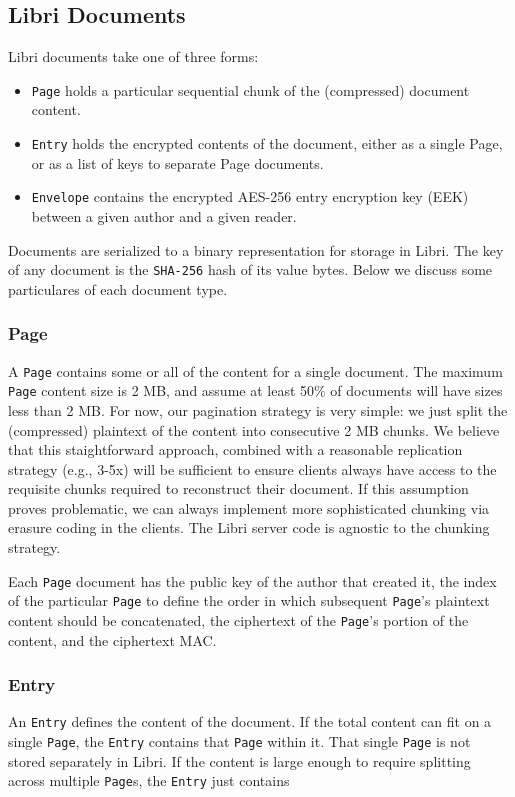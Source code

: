 \documentclass[10pt]{article}
\def\Entry{\texttt{Entry}}
\def\Page{\texttt{Page}}
\def\Envelope{\texttt{Envelope}}
\begin{document}
\subsection{Libri Documents}
\label{sec:Docs}
Libri documents take one of three forms:
\begin{itemize}
	\item \Page{} holds a particular sequential chunk of the (compressed) document content. 
	\item \Entry{} holds the encrypted contents of the document, either as a single Page, or as a list of keys to separate Page documents.
	\item \Envelope{} contains the encrypted AES-256 entry encryption key (EEK) between a given author and a given reader.
\end{itemize}
Documents are serialized to a binary representation for storage in Libri. The key of any document is the \texttt{SHA-256} hash of its value bytes. Below we discuss some particulares of each document type.

\subsubsection{Page}
A \Page{} contains some or all of the content for a single document. The maximum \Page {} content size is 2 MB, and assume at least 50\% of documents will have sizes less than 2 MB. For now, our pagination strategy is very simple: we just split the (compressed) plaintext of the content into consecutive 2 MB chunks. We believe that this staightforward approach, combined with a reasonable replication strategy (e.g., 3-5x) will be sufficient to ensure clients always have access to the requisite chunks required to reconstruct their document. If this assumption proves problematic, we can always implement more sophisticated chunking via erasure coding in the clients. The Libri server code is agnostic to the chunking strategy.

Each \Page{} document has the public key of the author that created it, the index of the particular \Page{} to define the order in which subsequent \Page{}'s plaintext content should be concatenated, the ciphertext of the \Page{}'s portion of the content, and the ciphertext MAC. 

\subsubsection{Entry}
An \Entry{} defines the content of the document. If the total content can fit on a single \Page{}, the \Entry{} contains that \Page{} within it. That single \Page{} is not stored separately in Libri. If the content is large enough to require splitting across multiple \Page{}s, the \Entry{} just contains 
\end{document}
